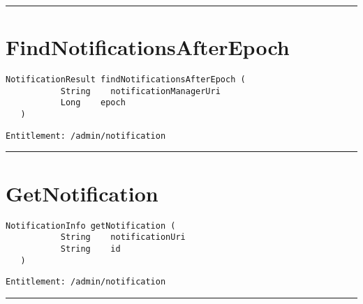 \rule{12cm}{2pt}
\section{FindNotificationsAfterEpoch}
\label{Api:FindNotificationsAfterEpoch}
\begin{lstlisting}[style=nonumbers]
   NotificationResult findNotificationsAfterEpoch (
           String    notificationManagerUri
           Long    epoch
   )
\end{lstlisting}
\begin{Verbatim}[formatcom=\color{Maroon}]
  Entitlement: /admin/notification
\end{Verbatim}



\rule{12cm}{2pt}
\section{GetNotification}
\label{Api:GetNotification}
\begin{lstlisting}[style=nonumbers]
   NotificationInfo getNotification (
           String    notificationUri
           String    id
   )
\end{lstlisting}
\begin{Verbatim}[formatcom=\color{Maroon}]
  Entitlement: /admin/notification
\end{Verbatim}



\rule{12cm}{2pt}
